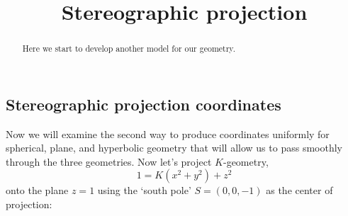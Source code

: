 \documentclass[newpage,hints,handout,12pt,noauthor,nooutcomes]{ximera}
\title{Stereographic projection}
\begin{document}
\begin{abstract}
Here we start to develop another model for our geometry.
\end{abstract}
\maketitle


\subsection{Stereographic projection coordinates}

Now we will examine the second way to produce coordinates uniformly for
spherical, plane, and hyperbolic geometry that will allow us to pass smoothly
through the three geometries. Now let's project $K$-geometry,
\[
1=K\left(x^{2}+y^{2}\right)+z^{2} 
\]
onto the plane $z=1$ using the `south pole' $S=(0,0,-1)$ as the center of
projection:
\end{document}
